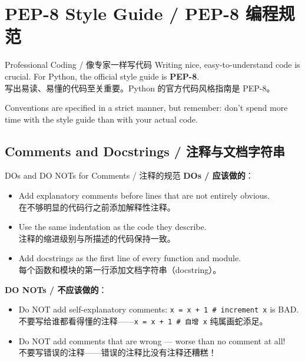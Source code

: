 \documentclass[11pt,a4paper]{report}
\let\oldtexttt\texttt
\renewcommand{\texttt}[1]{\textcolor{mainblue}{\oldtexttt{#1}}}
\begin{document}
\section{PEP-8 Style Guide / PEP-8 编程规范}

\begin{concept}{Professional Coding / 像专家一样写代码}
    Writing nice, easy-to-understand code is crucial. For Python, the official style guide is \textbf{PEP-8}. \\
    写出易读、易懂的代码至关重要。Python 的官方代码风格指南是 PEP-8。

    Conventions are specified in a strict manner, but remember: don't spend more time with the style guide than with your actual code.
\end{concept}

\subsection{Comments and Docstrings / 注释与文档字符串}

\begin{warning}{DOs and DO NOTs for Comments / 注释的规范}
    \textbf{DOs / 应该做的}：
    \begin{itemize}
        \item Add explanatory comments before lines that are not entirely obvious. \\
        在不够明显的代码行之前添加解释性注释。
        \item Use the same indentation as the code they describe. \\
        注释的缩进级别与所描述的代码保持一致。
        \item Add docstrings as the first line of every function and module. \\
        每个函数和模块的第一行添加文档字符串（docstring）。
    \end{itemize}

    \textbf{DO NOTs / 不应该做的}：
    \begin{itemize}
        \item Do NOT add self-explanatory comments: \texttt{x = x + 1  \# increment x} is BAD. \\
        不要写给谁都看得懂的注释——\texttt{x = x + 1  \# 自增 x} 纯属画蛇添足。
        \item Do NOT add comments that are wrong — worse than no comment at all! \\
        不要写错误的注释——错误的注释比没有注释还糟糕！
    \end{itemize}
\end{warning}
\end{document}
